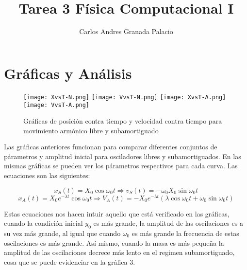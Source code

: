 \documentclass{article}
\title{Tarea 3 Física Computacional I}
\author{Carlos Andres Granada Palacio}
\begin{document}
\maketitle

\section*{Gráficas y Análisis}

\begin{figure}[h!]
\centering
\texttt{[image: XvsT-N.png]}
\texttt{[image: VvsT-N.png]}
\texttt{[image: XvsT-A.png]}
\texttt{[image: VvsT-A.png]}
\caption{Gráficas de posición contra tiempo y velocidad contra tiempo para movimiento armónico libre y subamortiguado}
\end{figure}

\noindent Las gráficas anteriores funcionan para comparar diferentes conjuntos de párametros y amplitud inicial para osciladores libres y subamortiguados. En las mismas gráficas se pueden ver los párametros respectivos para cada curva. Las ecuaciones son las siguientes:

$$x_S(t) = X_0 \cos \omega_0 t \Rightarrow v_S(t) = -\omega_0 X_0 \sin \omega_0 t$$
$$x_A(t) = X_0 e^{-\lambda t} \cos \omega_0 t \Rightarrow V_A(t) = -X_0 e^{-\lambda t} (\lambda \cos \omega_0 t + \omega_0 \sin \omega_0 t)$$

Estas ecuaciones nos hacen intuir aquello que está verificado en las gráficas, cuando la condición inicial $y_0$ es más grande, la amplitud de las oscilaciones es a su vez más grande, al igual que cuando $\omega_0$ es más grande la frecuencia de estas oscilaciones es más grande. Así mismo, cuando la masa es más pequeña la amplitud de las oscilaciones decrece más lento en el regimen subamortiguado, cosa que se puede evidenciar en la gráfica 3. 
\end{document}

